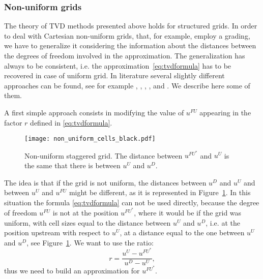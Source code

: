 \subsubsection{Non-uniform grids}
The theory of TVD methods presented above holds for structured grids. In order 
to deal with Cartesian non-uniform grids, that, for example, employ a grading, we 
have to generalize it considering the information about the distances between 
the degrees of freedom involved in the approximation. The generalization has 
always to be consistent, i.e. the approximation~\eqref{eq:tvdformula} has to be 
recovered in case of uniform grid. In literature several slightly different 
approaches can be found, see for example \cite{nonunif:bruner}, 
\cite{nonunif:darmou}, \cite{nonunif:li}, \cite{nonunif:berger}, 
\cite{nonunif:hou} and \cite{nonunif:zeng}. We describe here some of them.

A first simple approach consists in modifying the value of $u^{FU}$ appearing 
in the factor $r$ defined in \eqref{eq:tvdformula}.
\begin{figure}
	\centering
	\texttt{[image: non\_uniform\_cells\_black.pdf]}
	\caption[Non-uniform staggered grid]{Non-uniform staggered grid. The 
	distance between $u^{FU^*}$ and $u^U$ is the same that there is between 
	$u^U$ and $u^D$.}
	\label{fig:nonunifli}
\end{figure}

The idea is that if the grid is not uniform, the distances between $u^D$ and 
$u^U$ and between $u^U$ and $u^{FU}$ might be different, as it is represented 
in Figure~\ref{fig:nonunifli}. In this situation the formula 
\eqref{eq:tvdformula} can not be used directly, because the degree of freedom 
$u^{FU}$ is not at the position 
$u^{FU^*}$, where it would be if the grid was uniform, with cell sizes equal to 
the distance between $u^U$ and $u^D$, i.e. at the position upstream with 
respect to $u^U$, at a distance equal to the one between $u^U$ and $u^D$, see 
Figure~\ref{fig:nonunifli}. We want to use the ratio:
\begin{equation*}
r = \frac{u^U - u^{FU^*}}{u^D - u^U},
\end{equation*}
thus we need to build an approximation for $u^{FU^*}$.

